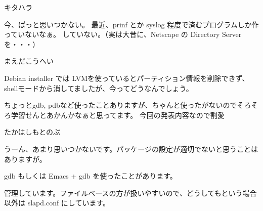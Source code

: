 \begin{prework}{ キタハラ }

 今、ぱっと思いつかない。
 最近、prinf とか syslog 程度で済むプログラムしか作っていないなぁ。
していない。（実は大昔に、Netscape の Directory Server を・・・）
\end{prework}

\begin{prework}{ まえだこうへい }

Debian installer では LVMを使っているとパーティション情報を削除できず、shellモードから消してましたが、今ってどうなんでしょう。

ちょっとgdb, pdbなど使ったことありますが、ちゃんと使ったがないのでそろそろ学習せんとあかんかなぁと思ってます。
今回の発表内容なので割愛
\end{prework}

\begin{prework}{ たかはしもとのぶ }


 うーん、あまり思いつかないです。パッケージの設定が適切でないと思うことはありますが。

  gdb もしくは Emacs + gdb を使ったことがあります。

  管理しています。ファイルベースの方が扱いやすいので、どうしてもという場合以外は slapd.conf にしています。
\end{prework}

